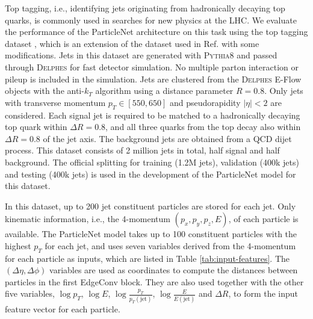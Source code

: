 \documentclass[aps,prd,longbibliography,reprint,amsmath,amssymb,amsfonts]{revtex4-1}
\begin{document}
Top tagging, i.e., identifying jets originating from hadronically decaying top quarks, is commonly used in searches for new physics at the LHC. We evaluate the performance of the ParticleNet architecture on this task using the top tagging dataset \cite{kasieczka_gregor_2019_2603256}, which is an extension of the dataset used in Ref. \cite{Butter:2017cot} with some modifications. Jets in this dataset are generated with \textsc{Pythia8} \cite{Sjostrand:2014zea} and passed through \textsc{Delphes} \cite{deFavereau:2013fsa} for fast detector simulation. No multiple parton interaction or pileup is included in the simulation. Jets are clustered from the \textsc{Delphes} E-Flow objects with the anti-$k_{T}$ algorithm \cite{Cacciari:2008gp} using a distance parameter $R=0.8$. Only jets with transverse momentum $p_{T}\in[550, 650]$ and pseudorapidity $|\eta|<2$ are considered. Each signal jet is required to be matched to a hadronically decaying top quark within $\Delta R=0.8$, and all three quarks from the top decay also within $\Delta R=0.8$ of the jet axis. The background jets are obtained from a QCD dijet process. This dataset consists of 2 million jets in total, half signal and half background. The official splitting for training (1.2M jets), validation (400k jets) and testing (400k jets) is used in the development of the ParticleNet model for this dataset. 

In this dataset, up to 200 jet constituent particles are stored for each jet. Only kinematic information, i.e., the 4-momentum $(p_x, p_y, p_z, E)$, of each particle is available. The ParticleNet model takes up to 100 constituent particles with the highest $p_T$ for each jet, and uses seven variables derived from the 4-momentum for each particle as inputs, which are listed in Table \ref{tab:input-features}. The $(\Delta \eta, \Delta \phi)$ variables are used as coordinates to compute the distances between particles in the first EdgeConv block. They are also used together with the other five variables, $\log p_T$, $\log E$, $\log \frac{p_T}{p_T(\text{jet})}$, $\log \frac{E}{E(\text{jet})}$ and $\Delta R$, to form the input feature vector for each particle. 
\end{document}
